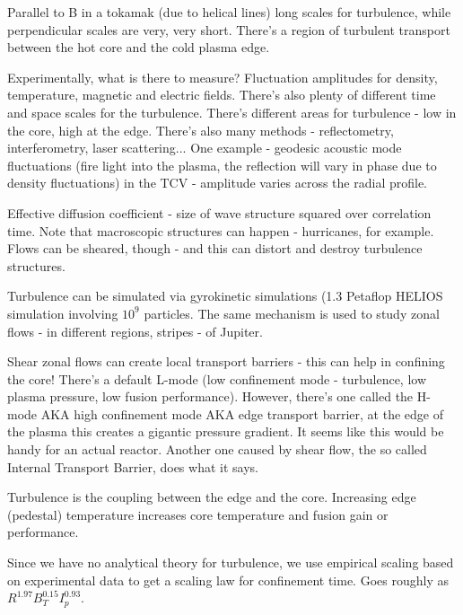 \documentclass[PlasmaNotes.tex]{subfiles}
\begin{document}
  
  Parallel to B in a tokamak (due to helical lines) long scales for turbulence, while perpendicular scales are very, very short. There's a region of turbulent transport between the hot core and the cold plasma edge.
  
  Experimentally, what is there to measure? Fluctuation amplitudes for density, temperature, magnetic and electric fields. There's also plenty of different time and space scales for the turbulence. There's different areas for turbulence - low in the core, high at the edge. There's also many methods - reflectometry, interferometry, laser scattering... One example - geodesic acoustic mode fluctuations (fire light into the plasma, the reflection will vary in phase due to density fluctuations) in the TCV - amplitude varies across the radial profile.
  
  Effective diffusion coefficient - size of wave structure squared over correlation time. Note that macroscopic structures can happen - hurricanes, for example. Flows can be sheared, though - and this can distort and destroy turbulence structures.
  
  Turbulence can be simulated via gyrokinetic simulations (1.3 Petaflop HELIOS simulation involving $10^9$ particles. The same mechanism is used to study zonal flows - in different regions, stripes - of Jupiter.
  
  Shear zonal flows can create local transport barriers - this can help in confining the core! There's a default L-mode (low confinement mode -  turbulence, low plasma pressure, low fusion performance). However, there's one called the H-mode AKA high confinement mode AKA edge transport barrier, at the edge of the plasma this creates a gigantic pressure gradient. It seems like this would be handy for an actual reactor. Another one caused by shear flow, the so called Internal Transport Barrier, does what it says.
  
  Turbulence is the coupling between the edge and the core. Increasing edge (pedestal) temperature increases core temperature and fusion gain or performance.
  
  Since we have no analytical theory for turbulence, we use empirical scaling based on experimental data to get a scaling law for confinement time. Goes roughly as $R^{1.97} B_T^{0.15} I_p^{0.93}$.
  
  
  
\end{document}

